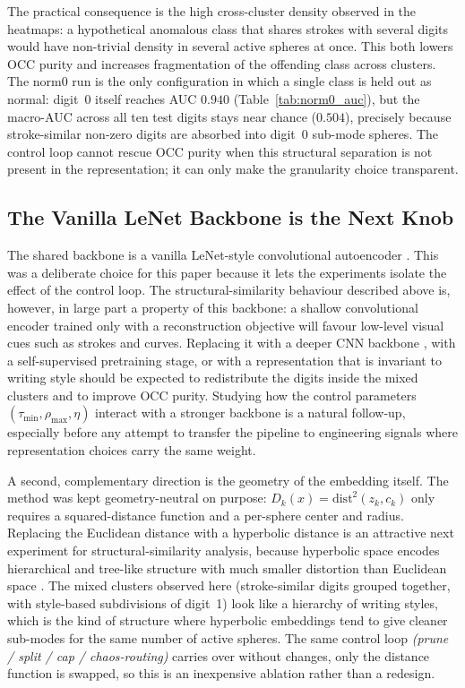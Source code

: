 \documentclass[conference]{IEEEtran}
\begin{document}
The practical consequence is the high cross-cluster density observed in the heatmaps: a hypothetical anomalous class that shares strokes with several digits would have non-trivial density in several active spheres at once. This both lowers OCC purity and increases fragmentation of the offending class across clusters. The norm0 run is the only configuration in which a single class is held out as normal: digit~0 itself reaches AUC \(0.940\) (Table~\ref{tab:norm0_auc}), but the macro-AUC across all ten test digits stays near chance (\(0.504\)), precisely because stroke-similar non-zero digits are absorbed into digit~0 sub-mode spheres. The control loop cannot rescue OCC purity when this structural separation is not present in the representation; it can only make the granularity choice transparent.

\subsection{The Vanilla LeNet Backbone is the Next Knob}
\label{sec:limits}
The shared backbone is a vanilla LeNet-style convolutional autoencoder \cite{lecun1998gradient}. This was a deliberate choice for this paper because it lets the experiments isolate the effect of the control loop. The structural-similarity behaviour described above is, however, in large part a property of this backbone: a shallow convolutional encoder trained only with a reconstruction objective will favour low-level visual cues such as strokes and curves. Replacing it with a deeper CNN backbone \cite{krizhevsky2012imagenet}, with a self-supervised pretraining stage, or with a representation that is invariant to writing style should be expected to redistribute the digits inside the mixed clusters and to improve OCC purity. Studying how the control parameters \((\tau_{\min},\rho_{\max},\eta)\) interact with a stronger backbone is a natural follow-up, especially before any attempt to transfer the pipeline to engineering signals where representation choices carry the same weight.

A second, complementary direction is the geometry of the embedding itself. The method was kept geometry-neutral on purpose: \(D_{k}(x)=\mathrm{dist}^{2}(z_{k},c_{k})\) only requires a squared-distance function and a per-sphere center and radius. Replacing the Euclidean distance with a hyperbolic distance is an attractive next experiment for structural-similarity analysis, because hyperbolic space encodes hierarchical and tree-like structure with much smaller distortion than Euclidean space \cite{nickel2017poincare,khrulkov2020hyperbolic}. The mixed clusters observed here (stroke-similar digits grouped together, with style-based subdivisions of digit~1) look like a hierarchy of writing styles, which is the kind of structure where hyperbolic embeddings tend to give cleaner sub-modes for the same number of active spheres. The same control loop \emph{(prune / split / cap / chaos-routing)} carries over without changes, only the distance function is swapped, so this is an inexpensive ablation rather than a redesign.
\end{document}

